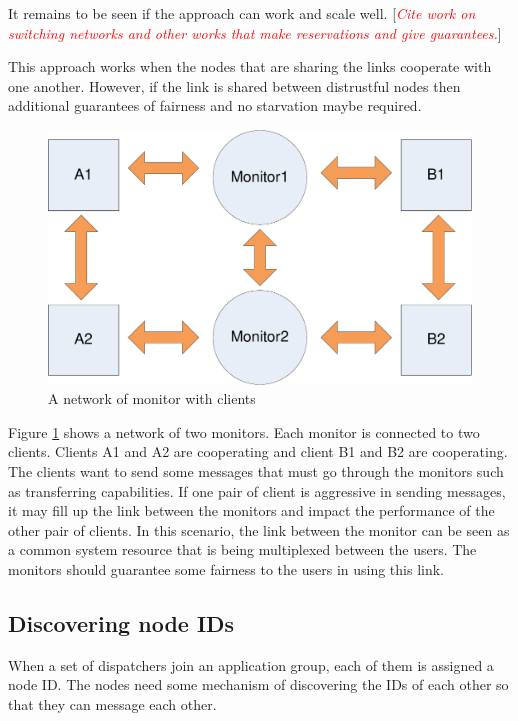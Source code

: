 \documentclass[a4paper,twoside]{report} %
\newcommand{\note}[1]{[\textcolor{red}{\textit{#1}}]}
\begin{document}
It remains to be seen if the approach can work and scale well.
\note{Cite work on switching networks and other works that make reservations and
  give guarantees.}

This approach works when the nodes that are sharing the links
cooperate with one another.
However, if the link is shared between distrustful
nodes then additional guarantees of fairness and no starvation maybe required.

\begin{figure}[t]
 \includegraphics[width=\columnwidth]{client-monitor.pdf}
 \caption{A network of monitor with clients}\label{fig:client-monitor}
\end{figure}

Figure \ref{fig:client-monitor} shows a network of two monitors.
Each monitor is connected to two clients.
Clients A1 and A2 are cooperating and client B1 and B2 are cooperating.
The clients want to send some messages that must go through the monitors such as
transferring capabilities.
If one pair of client is aggressive in sending messages,
it may fill up the link between the monitors and impact the performance
of the other pair of clients.
In this scenario, the link between the monitor can be seen
as a common system resource that is being multiplexed between the users.
The monitors should guarantee some fairness to the users in using this link.

\subsection{Discovering node IDs}
When a set of dispatchers join an application group,
each of them is assigned a node ID.
The nodes need some mechanism of discovering the IDs of each other
so that they can message each other.
\end{document}
